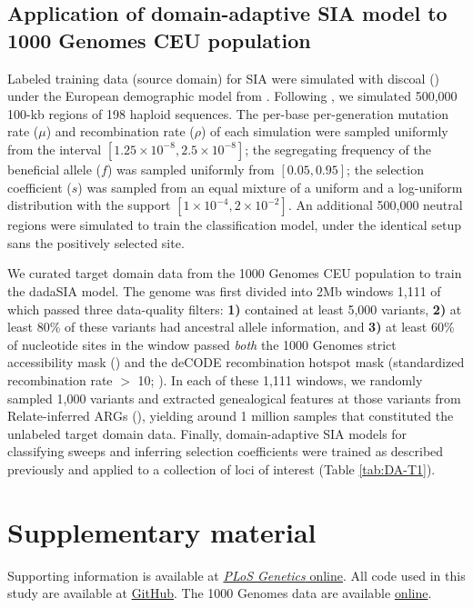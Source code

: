 \subsection{Application of domain-adaptive \ac{SIA} model to 1000 Genomes CEU population}

Labeled training data (source domain) for \ac{SIA} were simulated with discoal (\cite{kern_discoal_2016}) under the European demographic model from \cite{tennessen_evolution_2012}. Following \cite{hejase_deep-learning_2022}, we simulated 500,000 100-kb regions of 198 haploid sequences. The per-base per-generation mutation rate ($\mu$) and recombination rate ($\rho$) of each simulation were sampled uniformly from the interval $[1.25\times 10^{-8}, 2.5\times 10^{-8}]$; the segregating frequency of the beneficial allele ($f$) was sampled uniformly from $[0.05, 0.95]$; the selection coefficient ($s$) was sampled from an equal mixture of a uniform and a log-uniform distribution with the support $[1\times 10^{-4}, 2\times 10^{-2}]$. An additional 500,000 neutral regions were simulated to train the classification model, under the identical setup sans the positively selected site.

We curated target domain data from the 1000 Genomes CEU population to train the \ac{dadaSIA} model. The genome was first divided into 2Mb windows 1,111 of which passed three data-quality filters: \textbf{1)} contained at least 5,000 variants, \textbf{2)} at least 80\% of these variants had ancestral allele information, and \textbf{3)} at least 60\% of nucleotide sites in the window passed \textit{both} the 1000 Genomes strict accessibility mask (\cite{auton_global_2015}) and the deCODE recombination hotspot mask (standardized recombination rate $>$ 10; \cite{kong_fine-scale_2010}). In each of these 1,111 windows, we randomly sampled 1,000 variants and extracted genealogical features at those variants from Relate-inferred \acp{ARG} (\cite{speidel_method_2019}), yielding around 1 million samples that constituted the unlabeled target domain data. Finally, domain-adaptive \ac{SIA} models for classifying sweeps and inferring selection coefficients were trained as described previously and applied to a collection of loci of interest (Table \ref{tab:DA-T1}).

\section{Supplementary material}
Supporting information is available at \href{https://journals.plos.org/plosgenetics/article?id=10.1371/journal.pgen.1011032#sec018}{\textit{PLoS Genetics} online}. All code used in this study are available at \href{https://github.com/ziyimo/popgen-dom-adapt}{GitHub}. The 1000 Genomes data are available \href{https://www.internationalgenome.org/data}{online}.
